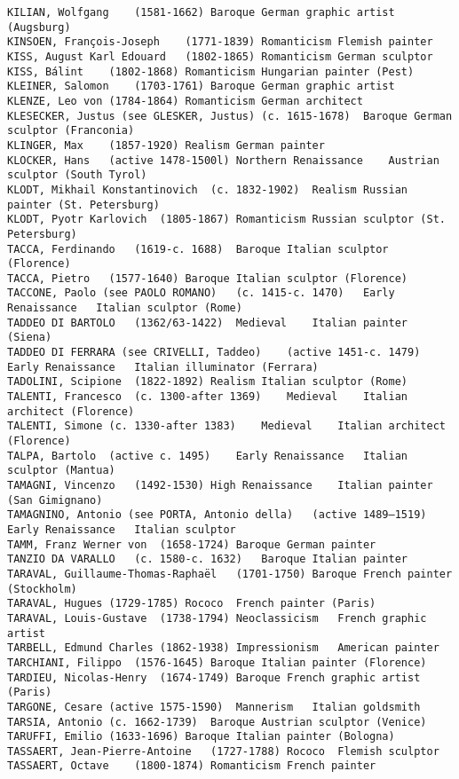 \documentclass[11pt]{article}
\begin{document}
    \begin{Verbatim}[commandchars=\\\{\}]
KILIAN, Wolfgang	(1581-1662)	Baroque	German graphic artist (Augsburg)
KINSOEN, François-Joseph	(1771-1839)	Romanticism	Flemish painter
KISS, August Karl Edouard	(1802-1865)	Romanticism	German sculptor
KISS, Bálint	(1802-1868)	Romanticism	Hungarian painter (Pest)
KLEINER, Salomon	(1703-1761)	Baroque	German graphic artist
KLENZE, Leo von	(1784-1864)	Romanticism	German architect
KLESECKER, Justus (see GLESKER, Justus)	(c. 1615-1678)	Baroque	German sculptor (Franconia)
KLINGER, Max	(1857-1920)	Realism	German painter
KLOCKER, Hans	(active 1478-1500l)	Northern Renaissance	Austrian sculptor (South Tyrol)
KLODT, Mikhail Konstantinovich	(c. 1832-1902)	Realism	Russian painter (St. Petersburg)
KLODT, Pyotr Karlovich	(1805-1867)	Romanticism	Russian sculptor (St. Petersburg)
TACCA, Ferdinando	(1619-c. 1688)	Baroque	Italian sculptor (Florence)
TACCA, Pietro	(1577-1640)	Baroque	Italian sculptor (Florence)
TACCONE, Paolo (see PAOLO ROMANO)	(c. 1415-c. 1470)	Early Renaissance	Italian sculptor (Rome)
TADDEO DI BARTOLO	(1362/63-1422)	Medieval	Italian painter (Siena)
TADDEO DI FERRARA (see CRIVELLI, Taddeo)	(active 1451-c. 1479)	Early Renaissance	Italian illuminator (Ferrara)
TADOLINI, Scipione	(1822-1892)	Realism	Italian sculptor (Rome)
TALENTI, Francesco	(c. 1300-after 1369)	Medieval	Italian architect (Florence)
TALENTI, Simone	(c. 1330-after 1383)	Medieval	Italian architect (Florence)
TALPA, Bartolo	(active c. 1495)	Early Renaissance	Italian sculptor (Mantua)
TAMAGNI, Vincenzo	(1492-1530)	High Renaissance	Italian painter (San Gimignano)
TAMAGNINO, Antonio (see PORTA, Antonio della)	(active 1489–1519)	Early Renaissance	Italian sculptor
TAMM, Franz Werner von	(1658-1724)	Baroque	German painter
TANZIO DA VARALLO	(c. 1580-c. 1632)	Baroque	Italian painter
TARAVAL, Guillaume-Thomas-Raphaël	(1701-1750)	Baroque	French painter (Stockholm)
TARAVAL, Hugues	(1729-1785)	Rococo	French painter (Paris)
TARAVAL, Louis-Gustave	(1738-1794)	Neoclassicism	French graphic artist
TARBELL, Edmund Charles	(1862-1938)	Impressionism	American painter
TARCHIANI, Filippo	(1576-1645)	Baroque	Italian painter (Florence)
TARDIEU, Nicolas-Henry	(1674-1749)	Baroque	French graphic artist (Paris)
TARGONE, Cesare	(active 1575-1590)	Mannerism	Italian goldsmith
TARSIA, Antonio	(c. 1662-1739)	Baroque	Austrian sculptor (Venice)
TARUFFI, Emilio	(1633-1696)	Baroque	Italian painter (Bologna)
TASSAERT, Jean-Pierre-Antoine	(1727-1788)	Rococo	Flemish sculptor
TASSAERT, Octave	(1800-1874)	Romanticism	French painter

\end{Verbatim}
\end{document}
